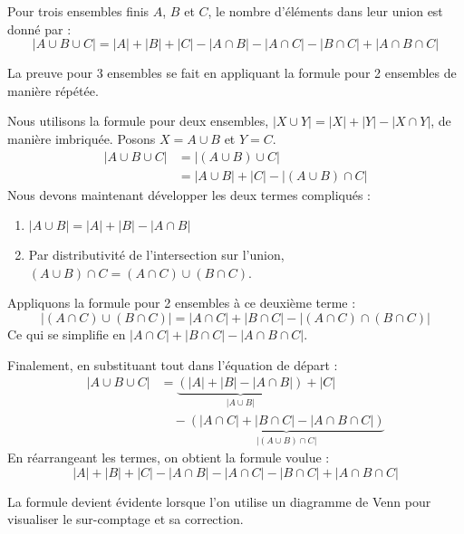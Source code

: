 \begin{theorembox}
Pour trois ensembles finis $A$, $B$ et $C$, le nombre d'éléments dans leur union est donné par :
$$ |A \cup B \cup C| = |A| + |B| + |C| - |A \cap B| - |A \cap C| - |B \cap C| + |A \cap B \cap C| $$
\end{theorembox}

La preuve pour 3 ensembles se fait en appliquant la formule pour 2 ensembles de manière répétée.

\begin{proofbox}
Nous utilisons la formule pour deux ensembles, $|X \cup Y| = |X| + |Y| - |X \cap Y|$, de manière imbriquée.
Posons $X = A \cup B$ et $Y = C$.
\begin{align*}
|A \cup B \cup C| &= |(A \cup B) \cup C| \\
&= |A \cup B| + |C| - |(A \cup B) \cap C|
\end{align*}
Nous devons maintenant développer les deux termes compliqués :
\begin{enumerate}
    \item $|A \cup B| = |A| + |B| - |A \cap B|$
    \item Par distributivité de l'intersection sur l'union, $(A \cup B) \cap C = (A \cap C) \cup (B \cap C)$.
\end{enumerate}
Appliquons la formule pour 2 ensembles à ce deuxième terme :
\[ |(A \cap C) \cup (B \cap C)| = |A \cap C| + |B \cap C| - |(A \cap C) \cap (B \cap C)| \]
Ce qui se simplifie en $|A \cap C| + |B \cap C| - |A \cap B \cap C|$.

Finalement, en substituant tout dans l'équation de départ :
\begin{align*}
|A \cup B \cup C| &= \underbrace{(|A| + |B| - |A \cap B|)}_{|A \cup B|} + |C| \\
                 &\quad - \underbrace{(|A \cap C| + |B \cap C| - |A \cap B \cap C|)}_{|(A \cup B) \cap C|}
\end{align*}
En réarrangeant les termes, on obtient la formule voulue :
\[ |A| + |B| + |C| - |A \cap B| - |A \cap C| - |B \cap C| + |A \cap B \cap C| \]
\end{proofbox}

La formule devient évidente lorsque l'on utilise un diagramme de Venn pour visualiser le sur-comptage et sa correction.

